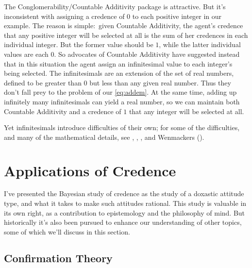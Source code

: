 The Conglomerability/Countable Additivity package is attractive. But it's inconsistent with assigning a credence of $0$ to each positive integer in our example. The reason is simple:\ given Countable Additivity, the agent's credence that any positive integer will be selected at all is the sum of her credences in each individual integer. But the former value should be $1$, while the latter individual values are each $0$. So advocates of Countable Additivity have suggested instead that in this situation the agent assign an infinitesimal value to each integer's being selected. The infinitesimals are an extension of the set of real numbers, defined to be greater than $0$ but less than any given real number. Thus they don't fall prey to the problem of our \autoref{eq:addem}. At the same time, adding up infinitely many infinitesimals can yield a real number, so we can maintain both Countable Additivity and a credence of $1$ that any integer will be selected at all.

Yet infinitesimals introduce difficulties of their own; for some of the difficulties, and many of the mathematical details, see \citet[Section 5]{HajekConditional}, \citet{WilliamsonInfinite}, \citet{EaswaranHyper}, and Wenmackers ().



\section{Applications of Credence}

I've presented the Bayesian study of credence as the study of a doxastic attitude type, and what it takes to make such attitudes rational.  This study is valuable in its own right, as a contribution to epistemology and the philosophy of mind. But historically it's also been pursued to enhance our understanding of other topics, some of which we'll discuss in this section. 

\subsection{Confirmation Theory} \label{ss:confirmation}

